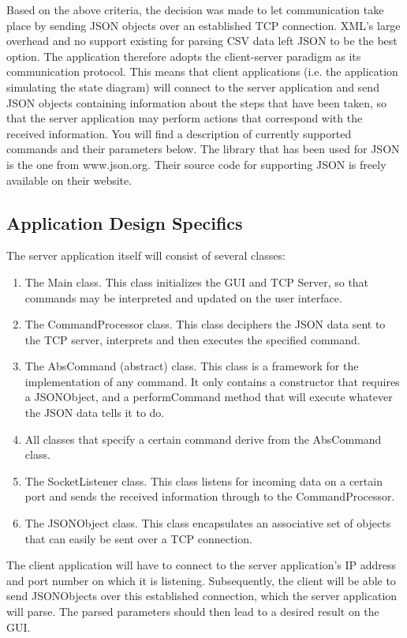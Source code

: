 \documentclass[11pt,a4paper]{article}
\begin{document}
Based on the above criteria, the decision was made to let communication take place by sending JSON objects over an established TCP connection. XML's large overhead and no support existing for parsing CSV data left JSON to be the best option. The application therefore adopts the client-server paradigm as its communication protocol. This means that client applications (i.e. the application simulating the state diagram) will connect to the server application and send JSON objects containing information about the steps that have been taken, so that the server application may perform actions that correspond with the received information. You will find a description of currently supported commands and their parameters below.
The library that has been used for JSON is the one from www.json.org. Their source code for supporting JSON is freely available on their website.
\subsection{Application Design Specifics}
The server application itself will consist of several classes:
\begin{enumerate}
\item The Main class. This class initializes the GUI and TCP Server, so that commands may be interpreted and updated on the user interface.
\item The CommandProcessor class. This class deciphers the JSON data sent to the TCP server, interprets and then executes the specified command.
\item The AbsCommand (abstract) class. This class is a framework for the implementation of any command. It only contains a constructor that requires a JSONObject, and a performCommand method that will execute whatever the JSON data tells it to do.
\item All classes that specify a certain command derive from the AbsCommand class.
\item The SocketListener class. This class listens for incoming data on a certain port and sends the received information through to the CommandProcessor.
\item The JSONObject class. This class encapsulates an associative set of objects that can easily be sent over a TCP connection.
\end{enumerate}
The client application will have to connect to the server application's IP address and port number on which it is listening. Subsequently, the client will be able to send JSONObjects over this established connection, which the server application will parse. The parsed parameters should then lead to a desired result on the GUI.
\end{document}
